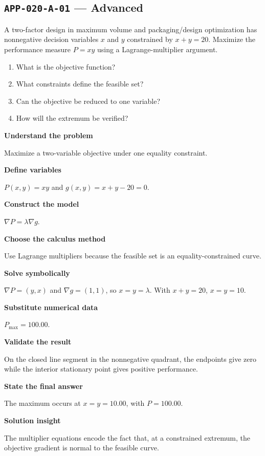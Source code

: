 \documentclass[11pt]{book}
\newcommand{\pid}[1]{\texttt{#1}}
\begin{document}
\subsection*{\pid{APP-020-A-01} — Advanced}
\begin{problembox}
A two-factor design in maximum volume and packaging/design optimization has nonnegative decision variables $x$ and $y$ constrained by $x+y=20$. Maximize the performance measure $P=xy$ using a Lagrange-multiplier argument.
\end{problembox}
\begin{promptbox}\begin{enumerate}
\item What is the objective function?
\item What constraints define the feasible set?
\item Can the objective be reduced to one variable?
\item How will the extremum be verified?
\end{enumerate}\end{promptbox}
\begin{solutionbox}
\textbf{Understand the problem}\par Maximize a two-variable objective under one equality constraint.\par\medskip
\textbf{Define variables}\par $P(x,y)=xy$ and $g(x,y)=x+y-20=0$.\par\medskip
\textbf{Construct the model}\par $\nabla P=\lambda\nabla g$.\par\medskip
\textbf{Choose the calculus method}\par Use Lagrange multipliers because the feasible set is an equality-constrained curve.\par\medskip
\textbf{Solve symbolically}\par $\nabla P=(y,x)$ and $\nabla g=(1,1)$, so $x=y=\lambda$. With $x+y=20$, $x=y=10$.\par\medskip
\textbf{Substitute numerical data}\par $P_{\max}=100.00$.\par\medskip
\textbf{Validate the result}\par On the closed line segment in the nonnegative quadrant, the endpoints give zero while the interior stationary point gives positive performance.\par\medskip
\textbf{State the final answer}\par The maximum occurs at $x=y=10.00$, with $P=100.00$.\par\medskip
\textbf{Solution insight}\par The multiplier equations encode the fact that, at a constrained extremum, the objective gradient is normal to the feasible curve.\par\medskip
\end{solutionbox}
\end{document}
